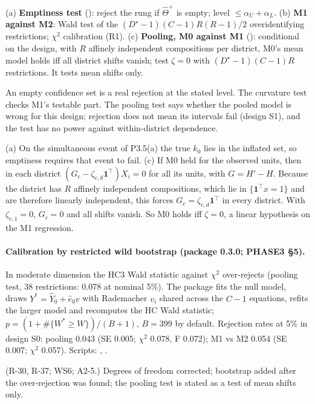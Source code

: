\begin{result}\label{res:p36}
(a) \textbf{Emptiness test} (): reject the rung if $\hat\Theta^+$ is
empty; level $\le\alpha_U+\alpha_L$. (b) \textbf{M1 against M2}: Wald test of the
$(D^\star-1)(C-1)R(R-1)/2$ overidentifying restrictions; $\chi^2$ calibration
 (R1). (c) \textbf{Pooling, M0 against M1}
(): conditional on the design, with $R$ affinely independent
compositions per district, M0's mean model holds iff all district shifts vanish;
test $\zeta=0$ with $(D^\star-1)(C-1)R$ restrictions. It tests mean shifts only.
\end{result}
\begin{plain}
An empty confidence set is a real rejection at the stated level. The curvature
test checks M1's testable part. The pooling test says whether the pooled model is
wrong for this design; rejection does not mean its intervals fail (design S1), and
the test has no power against within-district dependence.
\end{plain}
\begin{sketch}
(a) On the simultaneous event of P3.5(a) the true $k_0$ lies in the inflated set,
so emptiness requires that event to fail. (c) If M0 held for the observed units,
then in each district $(G_c-\zeta_{c,d}\mathbf 1^\top)X_i=0$ for all its units, with
$G=H'-H$. Because the district has $R$ affinely independent compositions, which
lie in $\{\mathbf 1^\top x=1\}$ and are therefore linearly independent, this forces
$G_c=\zeta_{c,d}\mathbf 1^\top$ in every district. With $\zeta_{c,1}=0$, $G_c=0$ and all
shifts vanish. So M0 holds iff $\zeta=0$, a linear hypothesis on the M1
regression.
\end{sketch}

\paragraph{Calibration by restricted wild bootstrap (package 0.3.0; PHASE3 \S5).}
 In moderate
dimension the HC3 Wald statistic against $\chi^2$ over-rejects (pooling test, 38
restrictions: 0.078 at nominal 5\%). The package fits the null model, draws
$Y^*=\hat Y_0+\hat e_0v$ with Rademacher $v_i$ shared across the $C-1$ equations,
refits the larger model and recomputes the HC Wald statistic;
$p=(1+\#\{W^*\ge W\})/(B+1)$, $B=399$ by default. Rejection rates at 5\% in design
S0: pooling 0.043 (SE 0.005; $\chi^2$ 0.078, F 0.072); M1 vs M2 0.054 (SE 0.007;
$\chi^2$ 0.057). Scripts: ,
.
\begin{revnote}(R-30, R-37; WS6; A2-5.) Degrees of freedom corrected; bootstrap added after the over-rejection was found; the pooling test is stated as a test of mean shifts only.\end{revnote}

